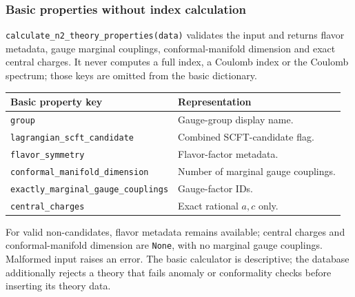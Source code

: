 \documentclass[11pt,a4paper]{article}
\numberwithin{equation}{section}
\newcommand{\code}[1]{{\small\nolinkurl{#1}}}
\begin{document}
\subsubsection{Basic properties without index calculation}
\code{calculate_n2_theory_properties(data)} validates the input and returns
flavor metadata, gauge marginal couplings, conformal-manifold dimension and
exact central charges. It never computes a full index, a Coulomb index or the
Coulomb spectrum; those keys are omitted from the basic dictionary.
\begin{tabularx}{\textwidth}{@{}Y>{\raggedright\arraybackslash}p{59mm}@{}}
\toprule Basic property key & Representation\\\midrule
\code{group} & Gauge-group display name.\\
\code{lagrangian_scft_candidate} & Combined SCFT-candidate flag.\\
\code{flavor_symmetry} & Flavor-factor metadata.\\
\code{conformal_manifold_dimension} & Number of marginal gauge couplings.\\
\code{exactly_marginal_gauge_couplings} & Gauge-factor IDs.\\
\code{central_charges} & Exact rational $a,c$ only.\\\bottomrule
\end{tabularx}
For valid non-candidates, flavor metadata remains available; central charges
and conformal-manifold dimension are \code{None}, with no marginal gauge
couplings. Malformed input raises an error. The basic calculator is descriptive;
the database additionally rejects a theory that fails anomaly or conformality
checks before inserting its theory data.

\clearpage
\end{document}

